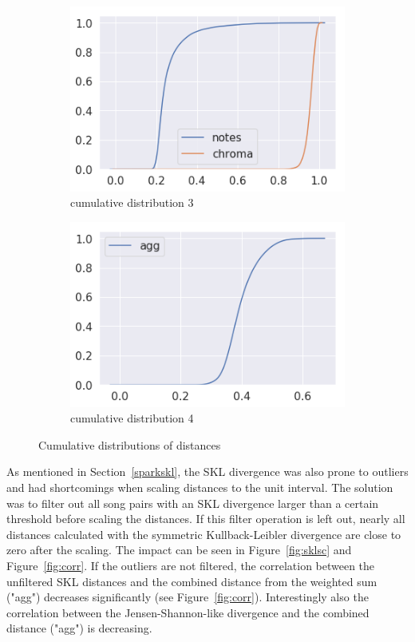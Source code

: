 \begin{figure}[htbp]
{{			\begin{subfigure}{.495\textwidth}
				\centering     
				\includegraphics[scale=0.5]{Images/SparkFeat/cum3.png}
				\caption{cumulative distribution 3}
				\label{cum3}
			\end{subfigure}%
			\begin{subfigure}{.495\textwidth}
				\centering    
				\includegraphics[scale=0.5]{Images/SparkFeat/cum4.png}
				\caption{cumulative distribution 4}
				\label{cum4}
			\end{subfigure}	
	}}
	\caption{Cumulative distributions of distances}
	\label{fig:cumdist}
\end{figure}
\FloatBarrier

\noindent As mentioned in Section~\ref{sparkskl}, the SKL divergence was also prone to outliers and had shortcomings when scaling distances to the unit interval. The solution was to filter out all song pairs with an SKL divergence larger than a certain threshold before scaling the distances. If this filter operation is left out, nearly all distances calculated with the symmetric Kullback-Leibler divergence are close to zero after the scaling. The impact can be seen in Figure~\ref{fig:sklsc} and Figure~\ref{fig:corr}.
\noindent If the outliers are not filtered, the correlation between the unfiltered SKL distances and the combined distance from the weighted sum ("agg") decreases significantly (see Figure~\ref{fig:corr}). Interestingly also the correlation between the Jensen-Shannon-like divergence and the combined distance ("agg") is decreasing. 


